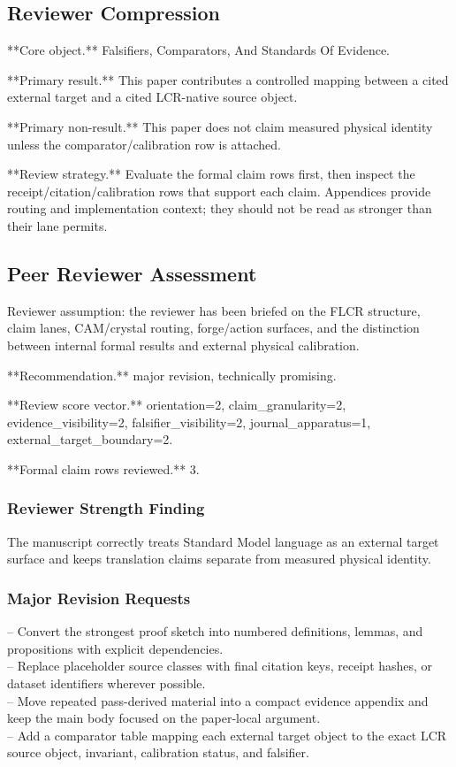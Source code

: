 \documentclass[11pt]{article}
\begin{document}
\subsection*{Reviewer Compression}

**Core object.** Falsifiers, Comparators, And Standards Of Evidence.

**Primary result.** This paper contributes a controlled mapping between a cited external target and a cited LCR-native source object.

**Primary non-result.** This paper does not claim measured physical identity unless the comparator/calibration row is attached.

**Review strategy.** Evaluate the formal claim rows first, then inspect the receipt/citation/calibration rows that support each claim. Appendices provide routing and implementation context; they should not be read as stronger than their lane permits.

\subsection*{Peer Reviewer Assessment}

Reviewer assumption: the reviewer has been briefed on the FLCR structure, claim lanes, CAM/crystal routing, forge/action surfaces, and the distinction between internal formal results and external physical calibration.

**Recommendation.** major revision, technically promising.

**Review score vector.** orientation=2, claim\_granularity=2, evidence\_visibility=2, falsifier\_visibility=2, journal\_apparatus=1, external\_target\_boundary=2.

**Formal claim rows reviewed.** 3.

\subsubsection*{Reviewer Strength Finding}

The manuscript correctly treats Standard Model language as an external target surface and keeps translation claims separate from measured physical identity.

\subsubsection*{Major Revision Requests}

\noindent{}-- Convert the strongest proof sketch into numbered definitions, lemmas, and propositions with explicit dependencies.\\
\noindent{}-- Replace placeholder source classes with final citation keys, receipt hashes, or dataset identifiers wherever possible.\\
\noindent{}-- Move repeated pass-derived material into a compact evidence appendix and keep the main body focused on the paper-local argument.\\
\noindent{}-- Add a comparator table mapping each external target object to the exact LCR source object, invariant, calibration status, and falsifier.\\
\end{document}
